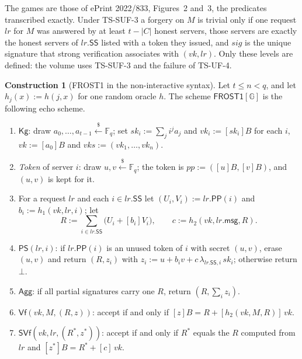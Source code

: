 \documentclass[11pt,a4paper]{article}
\theoremstyle{definition}
\newtheorem{construction}[theorem]{Construction}
\newcommand{\F}{\mathbb{F}}
\newcommand{\G}{\mathbb{G}}
\newcommand{\Fq}{\F_q}
\begin{document}
The games are those of ePrint 2022/833, Figures~2 and~3, the predicates
transcribed exactly. Under TS-SUF-3 a forgery on \(M\) is trivial only if one
request \(\mathit{lr}\) for \(M\) was answered by at least
\(t - \lvert C \rvert\) honest servers, those servers are exactly the honest
servers of \(\mathit{lr}.\mathsf{SS}\) listed with a token they issued, and
\(\mathit{sig}\) is the unique signature that strong verification associates
with \((\mathit{vk}, \mathit{lr})\). Only these levels are defined: the
volume uses TS-SUF-3 and the failure of TS-UF-4.

\begin{construction}[FROST1 in the non-interactive syntax]
\label{def:frost1}
Let \(t \le n < q\), and let \(h_j(x) := h(j, x)\) for one random oracle
\(h\). The scheme \(\mathsf{FROST1}[\G]\) is the following echo scheme.
\begin{enumerate}
\item \(\mathsf{Kg}\): draw \(a_0, \dots, a_{t-1} \xleftarrow{\$} \Fq\);
  set \(\mathit{sk}_i := \sum_{j} i^j a_j\) and
  \(\mathit{vk}_i := [\mathit{sk}_i]B\) for each \(i\),
  \(\mathit{vk} := [a_0]B\) and
  \(\mathit{vks} := (\mathit{vk}_1, \dots, \mathit{vk}_n)\).
\item \emph{Token} of server \(i\): draw \(u, v \xleftarrow{\$} \Fq\);
  the token is \(\mathit{pp} := ([u]B, [v]B)\), and \((u, v)\) is kept for
  it.
\item For a request \(\mathit{lr}\) and each \(i \in \mathit{lr}.\mathsf{SS}\)
  let \((U_i, V_i) := \mathit{lr}.\mathsf{PP}(i)\) and
  \(b_i := h_1(\mathit{vk}, \mathit{lr}, i)\); let
  \[
    R := \sum_{i \in \mathit{lr}.\mathsf{SS}} \bigl(U_i + [b_i]V_i\bigr) ,
    \qquad
    c := h_2(\mathit{vk}, \mathit{lr}.\mathsf{msg}, R) .
  \]
\item \(\mathsf{PS}(\mathit{lr}, i)\): if \(\mathit{lr}.\mathsf{PP}(i)\) is
  an unused token of \(i\) with secret \((u, v)\), erase \((u, v)\) and
  return \((R, z_i)\) with
  \(z_i := u + b_i v + c\, \lambda_{\mathit{lr}.\mathsf{SS}, i}\,
  \mathit{sk}_i\); otherwise return \(\bot\).
\item \(\mathsf{Agg}\): if all partial signatures carry one \(R\), return
  \((R, \sum_i z_i)\).
\item \(\mathsf{Vf}(\mathit{vk}, M, (R, z))\): accept if and only if
  \([z]B = R + [h_2(\mathit{vk}, M, R)]\,\mathit{vk}\).
\item \(\mathsf{SVf}(\mathit{vk}, \mathit{lr}, (R^{*}, z^{*}))\): accept if
  and only if \(R^{*}\) equals the \(R\) computed from \(\mathit{lr}\) and
  \([z^{*}]B = R^{*} + [c]\,\mathit{vk}\).
\end{enumerate}
\end{construction}
\end{document}

